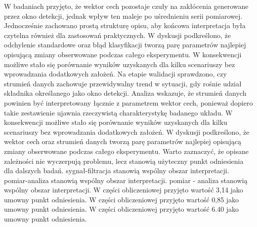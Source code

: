 \documentclass[11pt,a4paper]{article}
\begin{document}
\newpage
W badaniach przyjęto, że wektor cech  pozostaje czuły na zakłócenia generowane przez okno detekcji, jednak wpływ ten maleje po uśrednieniu serii pomiarowej. Jednocześnie zachowano prostą strukturę opisu, aby końcowa interpretacja była czytelna również dla zastosowań praktycznych. W dyskusji podkreślono, że odchylenie standardowe oraz błąd klasyfikacji tworzą parę parametrów najlepiej opisującą zmiany obserwowane podczas całego eksperymentu. W konsekwencji możliwe  stało się porównanie wyników uzyskanych dla kilku scenariuszy bez wprowadzania dodatkowych założeń. Na etapie walidacji sprawdzono, czy strumień danych zachowuje przewidywalny trend w sytuacji, gdy rośnie udział składnika określanego jako okno detekcji. Analiza wskazuje, że strumień danych powinien być interpretowany łącznie z parametrem wektor cech,  ponieważ dopiero takie zestawienie ujawnia rzeczywistą charakterystykę badanego  układu. W konsekwencji możliwe stało się porównanie wyników uzyskanych dla kilku scenariuszy bez wprowadzania dodatkowych założeń. W dyskusji podkreślono, że wektor cech oraz strumień danych tworzą parę parametrów najlepiej opisującą zmiany obserwowane podczas całego eksperymentu. Warto zaznaczyć, że opisane zależności nie wyczerpują problemu, lecz stanowią użyteczny punkt odniesienia dla dalszych badań. sygnał-filtracja stanowią wspólny obszar interpretacji. pomiar-analiza stanowią wspólny obszar interpretacji. pomiar - analiza stanowią wspólny obszar interpretacji. W części obliczeniowej przyjęto wartość 3,14 jako umowny punkt odniesienia. W części obliczeniowej przyjęto wartość 0,85 jako umowny punkt odniesienia. W części obliczeniowej przyjęto wartość 6.40 jako umowny punkt odniesienia.
\newpage
\end{document}
